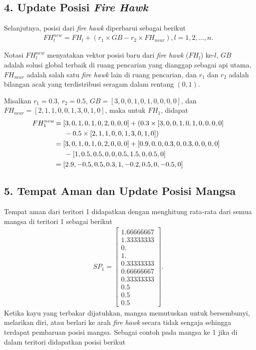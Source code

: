 \begin{contoh}
\subsection*{4. Update Posisi \textit{Fire Hawk}}
Selanjutnya, posisi dari \textit{fire hawk} diperbarui sebagai berikut
\begin{align*}
    FH_l^{\textit{new}}=FH_l+(r_1\times GB-r_2\times FH_{\textit{near}}), l=1,2,\ldots,n.
\end{align*}

Notasi $FH_l^{\textit{new}}$ menyatakan vektor posisi baru dari \textit{fire hawk} ($FH_l$) ke-$l$, $GB$ adalah solusi global terbaik di ruang pencarian yang dianggap sebagai api utama, $FH_{\textit{near}}$ adalah salah satu \textit{fire hawk} lain di ruang pencarian, dan $r_1$ dan $r_2$ adalah bilangan acak yang terdistribusi seragam dalam rentang $(0,1)$.

Misalkan $r_1 = 0.3$, $r_2 = 0.5$, $GB = [3,0,0,1,0,1,0,0,0,0]$, dan $FH_{\textit{near}} = [2,1,1,0,0,1,3,0,1,0]$, maka untuk $FH_1$, didapat
\begin{align*}
    FH_1^{\textit{new}} &= [3,0,1,0,1,0,2,0,0,0] + (0.3 \times [3,0,0,1,0,1,0,0,0,0] \\
    &\indent - 0.5 \times [2,1,1,0,0,1,3,0,1,0])\\
    &= [3,0,1,0,1,0,2,0,0,0] + [0.9,0,0,0.3,0,0.3,0,0,0,0]\\ 
    &\indent - [1,0.5,0.5,0,0,0.5,1.5,0,0.5,0]\\
    &= [2.9,-0.5,0.5,0.3,1,-0.2,0.5,0,-0.5,0]
\end{align*}

\subsection*{5. Tempat Aman dan Update Posisi Mangsa}
Tempat aman dari teritori 1 didapatkan dengan menghitung rata-rata dari semua mangsa di teritori 1 sebagai berikut
\begin{align*}
    SP_1 = \begin{bmatrix}
    1.66666667\\1.33333333\\0.\\1.\\0.33333333\\0.66666667\\0.33333333\\0.5\\0.5\\0.5       
    \end{bmatrix}.
\end{align*}
Ketika kayu yang terbakar dijatuhkan, mangsa memutuskan untuk bersembunyi, melarikan diri, atau berlari ke arah \textit{fire hawk} secara tidak sengaja sehingga terdapat pembaruan posisi mangsa. Sebagai contoh pada mangsa ke 1 jika di dalam teritori didapatkan posisi berikut


\end{contoh}
